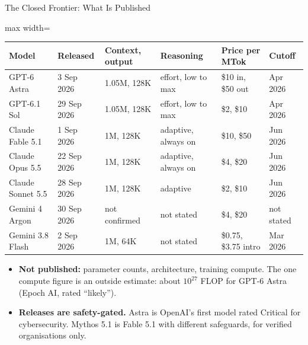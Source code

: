 \begin{frame}{The Closed Frontier: What Is Published}
    \begin{center}
    \footnotesize
    \renewcommand{\arraystretch}{1.1}
    \setlength{\tabcolsep}{4pt}\begin{adjustbox}{max width=\linewidth}\begin{tabular}{llllll}
        \toprule
        \textbf{Model} & \textbf{Released} & \textbf{Context, output} & \textbf{Reasoning} & \textbf{Price per MTok} & \textbf{Cutoff} \\
        \midrule
        GPT-6 Astra & 3 Sep 2026 & 1.05M, 128K & effort, low to max & \$10 in, \$50 out & Apr 2026 \\
        GPT-6.1 Sol & 29 Sep 2026 & 1.05M, 128K & effort, low to max & \$2, \$10 & Apr 2026 \\
        Claude Fable 5.1 & 1 Sep 2026 & 1M, 128K & adaptive, always on & \$10, \$50 & Jun 2026 \\
        Claude Opus 5.5 & 22 Sep 2026 & 1M, 128K & adaptive, always on & \$4, \$20 & Jun 2026 \\
        Claude Sonnet 5.5 & 28 Sep 2026 & 1M, 128K & adaptive & \$2, \$10 & Jun 2026 \\
        Gemini 4 Argon & 30 Sep 2026 & not confirmed & not stated & \$4, \$20 & not stated \\
        Gemini 3.8 Flash & 2 Sep 2026 & 1M, 64K & not stated & \$0.75, \$3.75 intro & Mar 2026 \\
        \bottomrule
    \end{tabular}\end{adjustbox}
    \end{center}
    \begin{itemize}\itemsep0.35em
        \item \textbf{Not published:} parameter counts, architecture, training compute. The one compute figure is an outside estimate: about $10^{27}$ FLOP for GPT-6 Astra (Epoch AI, rated ``likely'').
        \item \textbf{Releases are safety-gated.} Astra is OpenAI's first model rated Critical for cybersecurity. Mythos 5.1 is Fable 5.1 with different safeguards, for verified organisations only.
    \end{itemize}
\end{frame}

